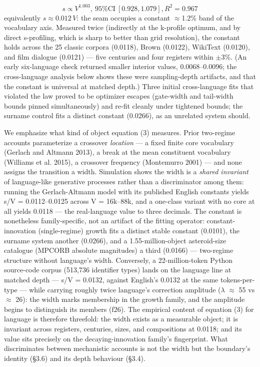 \documentclass[11pt]{article}
\begin{document}
\begin{equation}s \propto  V^{1.003},  \ \text{95\% CI}\  [0.928, 1.079],  R^2 = 0.967\end{equation}
equivalently \textbf{$s \approx 0.012\,V$}: the seam occupies a constant $\approx$1.2\% band of the vocabulary axis. Measured twice (indirectly at the k-profile optimum, and by direct s-profiling, which is sharp to better than grid resolution), the constant holds across the 25 classic corpora (0.0118), Brown (0.0122), WikiText (0.0120), and film dialogue (0.0121) --- five centuries and four registers within $\pm$3\%. (An early six-language check returned smaller interior values, 0.0068--0.0096; the cross-language analysis below shows these were sampling-depth artifacts, and that the constant is universal at matched depth.) Three initial cross-language fits that violated the law proved to be optimizer escapes (gate-width and tail-width bounds pinned simultaneously) and re-fit cleanly under tightened bounds; the surname control fits a distinct constant (0.0266), as an unrelated system should.

We emphasize what kind of object equation (3) measures. Prior two-regime accounts parameterize a crossover \emph{location} --- a fixed finite core vocabulary (Gerlach and Altmann 2013), a break at the mean constituent vocabulary (Williams et al. 2015), a crossover frequency (Montemurro 2001) --- and none assigns the transition a width. Simulation shows the width is a \emph{shared invariant} of language-like generative processes rather than a discriminator among them: running the Gerlach-Altmann model with its published English constants yields s/V = 0.0112--0.0125 across V = 16k--88k, and a one-class variant with no core at all yields 0.0118 --- the real-language value to three decimals. The constant is nonetheless family-specific, not an artifact of the fitting operator: constant-innovation (single-regime) growth fits a distinct stable constant (0.0101), the surname system another (0.0266), and a 1.55-million-object asteroid-size catalogue (MPCORB absolute magnitudes) a third (0.0166) --- two-regime structure without language's width. Conversely, a 22-million-token Python source-code corpus (513,736 identifier types) lands on the language line at matched depth --- s/V = 0.0132, against English's 0.0132 at the same tokens-per-type --- while carrying roughly twice language's correction amplitude ($\lambda$ $\approx$ 55 vs $\approx$ 26): the width marks membership in the growth family, and the amplitude begins to distinguish its members (f26). The empirical content of equation (3) for language is therefore threefold: the width exists as a measurable object; it is invariant across registers, centuries, sizes, and compositions at 0.0118; and its value sits precisely on the decaying-innovation family's fingerprint. What discriminates between mechanistic accounts is not the width but the boundary's identity (\S3.6) and its depth behaviour (\S3.4).
\end{document}
